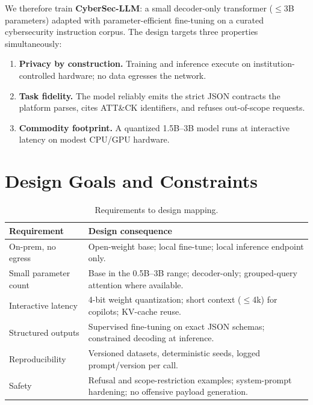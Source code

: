 \documentclass[11pt,a4paper]{article}
\begin{document}
We therefore train \textbf{CyberSec-LLM}: a small decoder-only transformer
($\leq 3$B parameters) adapted with parameter-efficient fine-tuning on a
curated cybersecurity instruction corpus. The design targets three properties
simultaneously:

\begin{enumerate}[leftmargin=*]
  \item \textbf{Privacy by construction.} Training and inference execute
        on institution-controlled hardware; no data egresses the network.
  \item \textbf{Task fidelity.} The model reliably emits the strict JSON
        contracts the platform parses, cites ATT\&CK identifiers, and refuses
        out-of-scope requests.
  \item \textbf{Commodity footprint.} A quantized 1.5B--3B model runs at
        interactive latency on modest CPU/GPU hardware.
\end{enumerate}

\section{Design Goals and Constraints}
\begin{table}[h]
\centering\small
\begin{tabular}{@{}p{4.4cm}p{10.2cm}@{}}
\toprule
\textbf{Requirement} & \textbf{Design consequence}\\
\midrule
On-prem, no egress & Open-weight base; local fine-tune; local inference endpoint only.\\
Small parameter count & Base in the 0.5B--3B range; decoder-only; grouped-query attention where available.\\
Interactive latency & 4-bit weight quantization; short context ($\leq$4k) for copilots; KV-cache reuse.\\
Structured outputs & Supervised fine-tuning on exact JSON schemas; constrained decoding at inference.\\
Reproducibility & Versioned datasets, deterministic seeds, logged prompt/version per call.\\
Safety & Refusal and scope-restriction examples; system-prompt hardening; no offensive payload generation.\\
\bottomrule
\end{tabular}
\caption{Requirements to design mapping.}
\end{table}
\end{document}

